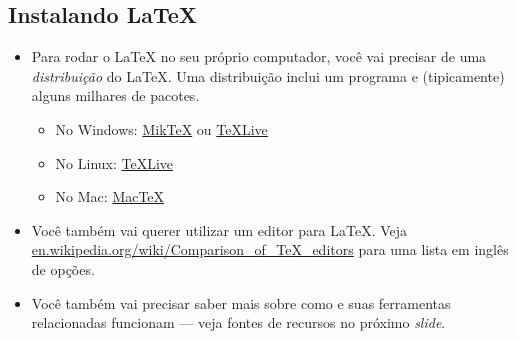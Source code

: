 \documentclass{beamer}
\begin{document}
\subsection{Instalando \LaTeX{}}
\begin{frame}{\insertsubsection}
\begin{itemize}
\item Para rodar o  \LaTeX{} no seu próprio computador, você vai precisar de uma \emph{distribuição} do \LaTeX{}. Uma distribuição inclui  um programa  e (tipicamente) alguns milhares de pacotes.
\begin{itemize}
\item No Windows: \href{http://miktex.org/}{Mik\TeX} ou \href{http://tug.org/texlive/}{\TeX Live}
\item No Linux: \href{http://tug.org/texlive/}{\TeX Live}
\item No Mac: \href{http://tug.org/mactex/}{Mac\TeX}
\end{itemize}
\item Você também vai querer utilizar um editor para \LaTeX{}. Veja \url{en.wikipedia.org/wiki/Comparison_of_TeX_editors} para uma lista em inglês de opções.
\item Você também vai precisar saber mais sobre como  e suas ferramentas relacionadas funcionam --- veja fontes de recursos no próximo \emph{slide}.
\end{itemize}
\end{frame}

\end{document}
